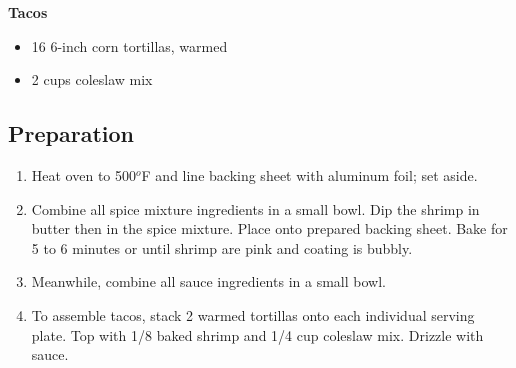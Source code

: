 \noindent\textbf{Tacos}
\begin{itemize}
    \item 16 6-inch corn tortillas, warmed
    \item 2 cups coleslaw mix
\end{itemize}

\subsection{Preparation}
\begin{enumerate}
    \item Heat oven to 500$^o$F and line backing sheet with aluminum foil; set aside.
    \item Combine all spice mixture ingredients in a small bowl. Dip the shrimp in
          butter then in the spice mixture. Place onto prepared backing sheet. Bake
          for 5 to 6 minutes or until shrimp are pink and coating is bubbly.
    \item Meanwhile, combine all sauce ingredients in a small bowl.
    \item To assemble tacos, stack 2 warmed tortillas onto each individual serving
          plate. Top with 1/8 baked shrimp and 1/4 cup coleslaw mix. Drizzle with sauce.
\end{enumerate}
